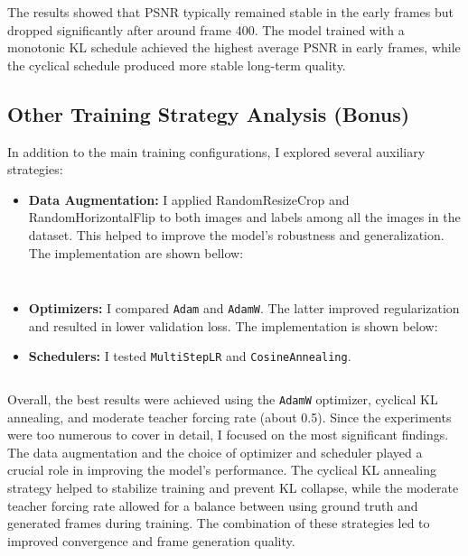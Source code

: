The results showed that PSNR typically remained stable in the early frames but dropped significantly after around frame 400. The model trained with a monotonic KL schedule achieved the highest average PSNR in early frames, while the cyclical schedule produced more stable long-term quality.

\subsection{Other Training Strategy Analysis (Bonus)}

In addition to the main training configurations, I explored several auxiliary strategies:

\begin{itemize}
    \item \textbf{Data Augmentation:} I applied RandomResizeCrop and RandomHorizontalFlip to both images and labels among all the images in the dataset. This helped to improve the model's robustness and generalization. The implementation are shown bellow:
          \inputminted[firstline=57, highlightlines={71,72,74-76}]{python}{../dataloader.py}
          \inputminted[firstline=368,lastline=394,highlightlines={369-375}]{python}{../Trainer.py}
    \item \textbf{Optimizers:} I compared \texttt{Adam} and \texttt{AdamW}. The latter improved regularization and resulted in lower validation loss. The implementation is shown below:
    \item \textbf{Schedulers:} I tested \texttt{MultiStepLR} and \texttt{CosineAnnealing}.
          \inputminted[firstline=102, lastline=122, highlightlines={109-120}]{python}{../Trainer.py}
\end{itemize}

Overall, the best results were achieved using the \texttt{AdamW} optimizer, cyclical KL annealing, and moderate teacher forcing rate (about 0.5).
Since the experiments were too numerous to cover in detail, I focused on the most significant findings. The data augmentation and the choice of optimizer and scheduler played a crucial role in improving the model's performance. The cyclical KL annealing strategy helped to stabilize training and prevent KL collapse, while the moderate teacher forcing rate allowed for a balance between using ground truth and generated frames during training.
The combination of these strategies led to improved convergence and frame generation quality.
